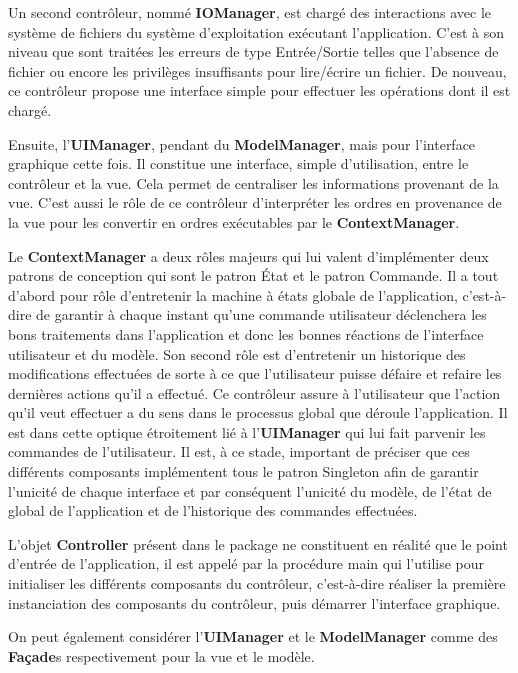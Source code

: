 \documentclass[paper=a4, fontsize=11pt]{report}
\numberwithin{equation}{section}		%
\numberwithin{figure}{section}		%
\numberwithin{table}{section}		%
\renewcommand{\bf}[1]{\textbf{#1}}
\begin{document}
Un second contrôleur, nommé \bf{IOManager}, est chargé des interactions avec le système de fichiers du système d'exploitation exécutant l'application. C’est à son niveau que sont traitées les erreurs de type Entrée/Sortie telles que l'absence de fichier ou encore les privilèges insuffisants pour lire/écrire un fichier. De nouveau, ce contrôleur propose une interface simple pour effectuer les opérations dont il est chargé. 

Ensuite, l'\bf{UIManager}, pendant du \bf{ModelManager}, mais pour l'interface graphique cette fois. Il constitue une interface, simple d'utilisation, entre le contrôleur et la vue. Cela permet de centraliser les informations provenant de la vue. C'est aussi le rôle de ce contrôleur d'interpréter les ordres en provenance de la vue pour les convertir en ordres exécutables par le \bf{ContextManager}. 

Le \bf{ContextManager} a deux rôles majeurs qui lui valent d'implémenter deux patrons de conception qui sont le patron État et le patron Commande. Il a tout d'abord pour rôle d'entretenir la machine à états globale de l'application, c'est-à-dire de garantir à chaque instant qu'une commande utilisateur déclenchera les bons traitements dans l'application et donc les bonnes réactions de l'interface utilisateur et du modèle. Son second rôle est d'entretenir un historique des modifications effectuées de sorte à ce que l'utilisateur puisse défaire et refaire les dernières actions qu'il a effectué. Ce contrôleur assure à l'utilisateur que l'action qu'il veut effectuer a du sens dans le processus global que déroule l'application. Il est dans cette optique étroitement lié à l'\bf{UIManager} qui lui fait parvenir les commandes de l'utilisateur.
Il est, à ce stade, important de préciser que ces différents composants implémentent tous le patron Singleton afin de garantir l'unicité de chaque interface et par conséquent l'unicité du modèle, de l'état de global de l'application et de l'historique des commandes effectuées.

L'objet \bf{Controller} présent dans le package ne constituent en réalité que le point d'entrée de l'application, il est appelé par la procédure main qui l'utilise pour initialiser les différents composants du contrôleur, c'est-à-dire réaliser la première instanciation des composants du contrôleur, puis démarrer l'interface graphique.

On peut également considérer l'\bf{UIManager} et le \bf{ModelManager} comme des \bf{Façade}s respectivement pour la vue et le modèle. 
\end{document}
